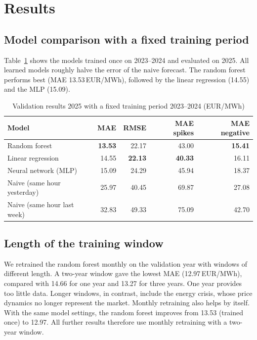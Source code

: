 \documentclass[12pt,oneside]{article}
\begin{document}
\section{Results} \label{sec:results}

\subsection{Model comparison with a fixed training period}

Table~\ref{tab:valfixed} shows the models trained once on 2023--2024 and evaluated on 2025. All learned models roughly halve the error of the naive forecast. The random forest performs best (MAE 13.53\,EUR/MWh), followed by the linear regression (14.55) and the MLP (15.09).

\begin{table}[!htbp]
    \centering
    \caption{Validation results 2025 with a fixed training period 2023--2024 (EUR/MWh)}
    \begin{tabular}{lrrrr}
        \toprule
        Model & MAE & RMSE & MAE spikes & MAE negative \\
        \midrule
        Random forest & \textbf{13.53} & 22.17 & 43.00 & \textbf{15.41} \\
        Linear regression & 14.55 & \textbf{22.13} & \textbf{40.33} & 16.11 \\
        Neural network (MLP) & 15.09 & 24.29 & 45.94 & 18.37 \\
        Naive (same hour yesterday) & 25.97 & 40.45 & 69.87 & 27.08 \\
        Naive (same hour last week) & 32.83 & 49.33 & 75.09 & 42.70 \\
        \bottomrule
    \end{tabular}
    \label{tab:valfixed}
\end{table}

\subsection{Length of the training window} \label{sec:window}

We retrained the random forest monthly on the validation year with windows of different length. A two-year window gave the lowest MAE (12.97\,EUR/MWh), compared with 14.66 for one year and 13.27 for three years. One year provides too little data. Longer windows, in contrast, include the energy crisis, whose price dynamics no longer represent the market. Monthly retraining also helps by itself. With the same model settings, the random forest improves from 13.53 (trained once) to 12.97. All further results therefore use monthly retraining with a two-year window.
\end{document}
